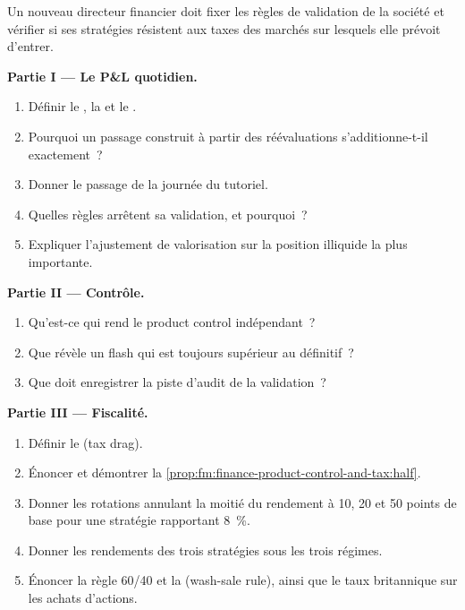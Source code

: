 \begin{problem}\label{pb:fm:finance-product-control-and-tax:1}
Un nouveau directeur financier doit fixer les règles de validation de la société et vérifier si ses stratégies résistent aux taxes des marchés sur lesquels elle prévoit d'entrer.

\medskip\noindent\textbf{Partie I --- Le P\&L quotidien.}
\begin{enumerate}
\item Définir le , la  et le .
\item Pourquoi un passage construit à partir des réévaluations s'additionne-t-il exactement~?
\item Donner le passage de la journée du tutoriel.
\item Quelles règles arrêtent sa validation, et pourquoi~?
\item Expliquer l'ajustement de valorisation sur la position illiquide la plus importante.
\end{enumerate}

\medskip\noindent\textbf{Partie II --- Contrôle.}
\begin{enumerate}[resume]
\item Qu'est-ce qui rend le product control indépendant~?
\item Que révèle un flash qui est toujours supérieur au définitif~?
\item Que doit enregistrer la piste d'audit de la validation~?
\end{enumerate}

\medskip\noindent\textbf{Partie III --- Fiscalité.}
\begin{enumerate}[resume]
\item Définir le  (tax drag).
\item Énoncer et démontrer la \cref{prop:fm:finance-product-control-and-tax:half}.
\item Donner les rotations annulant la moitié du rendement à 10, 20 et 50 points de base pour une stratégie rapportant 8~\%.
\item Donner les rendements des trois stratégies sous les trois régimes.
\item Énoncer la règle 60/40 et la  (wash-sale rule), ainsi que le taux britannique sur les achats d'actions.
\end{enumerate}


\end{problem}
